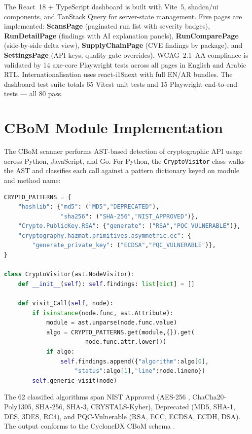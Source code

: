The React~18 + TypeScript \cite{typescript_docs} dashboard is built with Vite~5, shadcn/ui components, and TanStack Query for server-state management. Five pages are implemented: \textbf{ScansPage} (paginated run list with severity badges), \textbf{RunDetailPage} (findings with AI explanation panels), \textbf{RunComparePage} (side-by-side delta view), \textbf{SupplyChainPage} (CVE findings by package), and \textbf{SettingsPage} (API keys, quality gate overrides). WCAG~2.1~AA compliance \cite{wcag21} is validated by 14 axe-core Playwright tests across all pages in English and Arabic RTL. Internationalisation uses react-i18next with full EN/AR bundles. The dashboard test suite totals 65 Vitest unit tests and 15 Playwright end-to-end tests — all 80 pass.

\clearpage
\section{CBoM Module Implementation}
\label{sec:cbom_impl}

The CBoM scanner performs AST-based detection of cryptographic API usage across Python, JavaScript, and Go. For Python, the \texttt{CryptoVisitor} class walks the AST and classifies each call against a pattern dictionary keyed on module and method name:

\begin{lstlisting}[language=Python, basicstyle=\footnotesize\ttfamily, caption={CBoM AST Visitor (Python, core pattern)}]
CRYPTO_PATTERNS = {
    "hashlib": {"md5": ("MD5","DEPRECATED"),
                "sha256": ("SHA-256","NIST_APPROVED")},
    "Crypto.PublicKey.RSA": {"generate": ("RSA","PQC_VULNERABLE")},
    "cryptography.hazmat.primitives.asymmetric.ec": {
        "generate_private_key": ("ECDSA","PQC_VULNERABLE")},
}

class CryptoVisitor(ast.NodeVisitor):
    def __init__(self): self.findings: list[dict] = []

    def visit_Call(self, node):
        if isinstance(node.func, ast.Attribute):
            module = ast.unparse(node.func.value)
            algo = CRYPTO_PATTERNS.get(module,{}).get(
                       node.func.attr.lower())
            if algo:
                self.findings.append({"algorithm":algo[0],
                    "status":algo[1],"line":node.lineno})
        self.generic_visit(node)
\end{lstlisting}

The 62 classified algorithms span NIST Approved (AES-256 \cite{nist_fips_197}, ChaCha20-Poly1305, SHA-256, SHA-3, CRYSTALS-Kyber), Deprecated (MD5, SHA-1, DES, 3DES, RC4), and PQC-Vulnerable (RSA, ECC, ECDSA, ECDH, DSA). The output conforms to the CycloneDX CBoM schema \cite{cyclonedx}.


